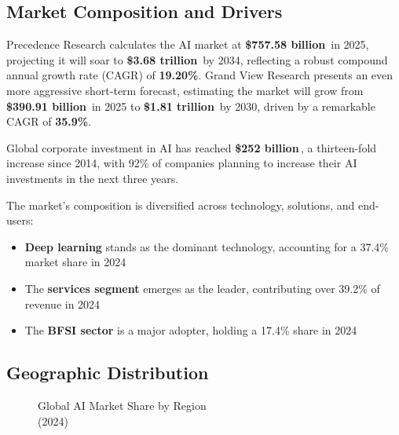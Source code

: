 \documentclass[11pt,a4paper]{report}
\newcommand{\marketvalue}[2]{\textcolor{trust}{\textbf{\$#1}}\,\textcolor{darkgray}{#2}}
\newcommand{\cagr}[1]{\textcolor{sun}{\textbf{#1\%}}}
\begin{document}
\subsection{Market Composition and Drivers}

Precedence Research calculates the AI market at \marketvalue{757.58 billion}{} in 2025, projecting it will soar to \marketvalue{3.68 trillion}{} by 2034, reflecting a robust compound annual growth rate (CAGR) of \cagr{19.20}. Grand View Research presents an even more aggressive short-term forecast, estimating the market will grow from \marketvalue{390.91 billion}{} in 2025 to \marketvalue{1.81 trillion}{} by 2030, driven by a remarkable CAGR of \cagr{35.9}.

\begin{keypoint}
Global corporate investment in AI has reached \marketvalue{252 billion}{}, a thirteen-fold increase since 2014, with 92\% of companies planning to increase their AI investments in the next three years.
\end{keypoint}

The market's composition is diversified across technology, solutions, and end-users:

\begin{itemize}
    \item \textbf{Deep learning} stands as the dominant technology, accounting for a 37.4\% market share in 2024
    \item The \textbf{services segment} emerges as the leader, contributing over 39.2\% of revenue in 2024
    \item The \textbf{BFSI sector} is a major adopter, holding a 17.4\% share in 2024
\end{itemize}

\subsection{Geographic Distribution}
\begin{wrapfigure}{r}{0.5\textwidth}
\centering
{}
\caption{Global AI Market Share by Region\\(2024)}
\end{wrapfigure}
\end{document}
